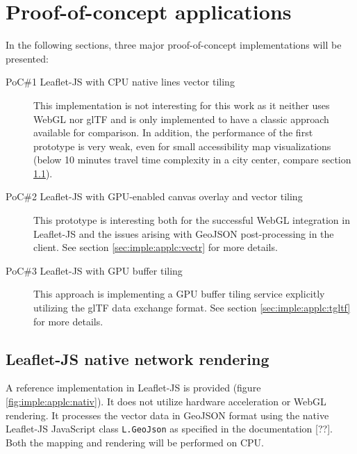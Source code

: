   \section{Proof-of-concept applications}
    \label{sec:imple:applc}
    In the following sections, three major proof-of-concept implementations will
    be presented:\par

    \begin{description}
      \item[PoC\#1 Leaflet-JS with CPU native lines vector
        tiling] This implementation is not interesting for
        this work as it neither uses WebGL nor glTF and is only implemented to
        have a classic approach available for comparison. In addition, the
        performance of the
        first prototype is very weak, even for small accessibility map
        visualizations (below 10 minutes travel time complexity in a city
        center, compare section \ref{sec:imple:applc:nativ}).
      \item[PoC\#2 Leaflet-JS with GPU-enabled canvas overlay and vector tiling]
        This prototype is interesting both for the successful
        WebGL integration in Leaflet-JS and the issues arising with GeoJSON
        post-processing in the client. See section \ref{sec:imple:applc:vectr}
        for more details.
      \item[PoC\#3 Leaflet-JS with GPU buffer tiling] This approach
        is implementing a GPU buffer tiling service explicitly utilizing the
        glTF data exchange format. See section \ref{sec:imple:applc:tgltf} for
        more details.
    \end{description}

    \subsection{Leaflet-JS native network rendering}
      \label{sec:imple:applc:nativ}
      A reference implementation in Leaflet-JS is provided (figure
      \ref{fig:imple:applc:nativ}). It does not utilize hardware acceleration or
      WebGL rendering. It processes the vector data in GeoJSON format using the
      native Leaflet-JS JavaScript class \texttt{L.GeoJson} as specified in the
      documentation [??]. Both the mapping and rendering will be performed on
      CPU.\par

